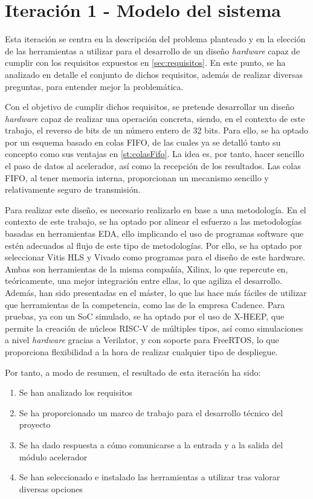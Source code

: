 \section{Iteración 1 - Modelo del sistema}
\label{res:iteracion1}
Esta iteración se centra en la descripción del problema planteado y en la elección de las herramientas a utilizar para el desarrollo de un diseño \textit{hardware} capaz de cumplir con los requisitos expuestos en \ref{sec:requisitos}. En este punto, se ha analizado en detalle el conjunto de dichos requisitos, además de realizar diversas preguntas, para entender mejor la problemática.

Con el objetivo de cumplir dichos requisitos, se pretende desarrollar un diseño \textit{hardware} capaz de realizar una operación concreta, siendo, en el contexto de este trabajo, el reverso de bits de un número entero de 32 bits. Para ello, se ha optado por un esquema basado en colas \ac{FIFO}, de las cuales ya se detalló tanto su concepto como sus ventajas en \ref{st:colasFifo}. La idea es, por tanto, hacer sencillo el paso de datos al acelerador, así como la recepción de los resultados. Las colas FIFO, al tener memoria interna, proporcionan un mecanismo sencillo y relativamente seguro de transmisión.

Para realizar este diseño, es necesario realizarlo en base a una metodología. En el contexto de este trabajo, se ha optado por alinear el esfuerzo a las metodologías basadas en herramientas EDA, ello implicando el uso de programas software que estén adecuados al flujo de este tipo de metodologías. Por ello, se ha optado por seleccionar Vitis HLS y Vivado como programas para el diseño de este hardware. Ambas son herramientas de la misma compañía, Xilinx, lo que repercute en, teóricamente, una mejor integración entre ellas, lo que agiliza el desarrollo. Además, han sido presentadas en el máster, lo que las hace más fáciles de utilizar que herramientas de la competencia, como las de la empresa Cadence. Para pruebas, ya con un SoC simulado, se ha optado por el uso de X-HEEP, que permite la creación de núcleos RISC-V de múltiples tipos, así como simulaciones a nivel \textit{hardware} gracias a Verilator, y con soporte para FreeRTOS, lo que proporciona flexibilidad a la hora de realizar cualquier tipo de despliegue.

Por tanto, a modo de resumen, el resultado de esta iteración ha sido:

\begin{enumerate}
    \item Se han analizado los requisitos
    \item Se ha proporcionado un marco de trabajo para el desarrollo técnico del proyecto
    \item Se ha dado respuesta a cómo comunicarse a la entrada y a la salida del módulo acelerador
    \item Se han seleccionado e instalado las herramientas a utilizar tras valorar diversas opciones
\end{enumerate}

